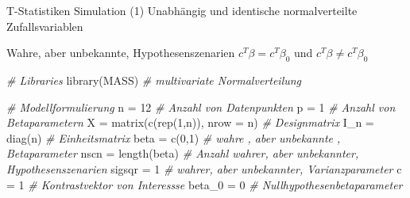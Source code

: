 \documentclass[
  8pt,
  ignorenonframetext,
]{beamer}
\newenvironment{Shaded}{\begin{snugshade}}{\end{snugshade}}
\newcommand{\AttributeTok}[1]{\textcolor[rgb]{0.77,0.63,0.00}{#1}}
\newcommand{\CommentTok}[1]{\textcolor[rgb]{0.56,0.35,0.01}{\textit{#1}}}
\newcommand{\DecValTok}[1]{\textcolor[rgb]{0.00,0.00,0.81}{#1}}
\newcommand{\FunctionTok}[1]{\textcolor[rgb]{0.00,0.00,0.00}{#1}}
\newcommand{\NormalTok}[1]{#1}
\newcommand{\OtherTok}[1]{\textcolor[rgb]{0.56,0.35,0.01}{#1}}
\begin{document}
\begin{frame}[fragile]{T-Statistiken}
\protect\hypertarget{t-statistiken-4}{}
Simulation (1) Unabhängig und identische normalverteilte
Zufallsvariablen

\small

Wahre, aber unbekannte, Hypothesenszenarien \(c^T\beta = c^T\beta_0\)
und \(c^T\beta \neq c^T\beta_0\)

\vspace{2mm}
\tiny
{}

\begin{Shaded}
\begin{Highlighting}[]
\CommentTok{\# Libraries}
\FunctionTok{library}\NormalTok{(MASS)                                                  }\CommentTok{\# multivariate Normalverteilung}

\CommentTok{\# Modellformulierung}
\NormalTok{n          }\OtherTok{=} \DecValTok{12}                                                \CommentTok{\# Anzahl von Datenpunkten}
\NormalTok{p          }\OtherTok{=} \DecValTok{1}                                                 \CommentTok{\# Anzahl von Betaparametern}
\NormalTok{X          }\OtherTok{=} \FunctionTok{matrix}\NormalTok{(}\FunctionTok{c}\NormalTok{(}\FunctionTok{rep}\NormalTok{(}\DecValTok{1}\NormalTok{,n)), }\AttributeTok{nrow =}\NormalTok{ n)                     }\CommentTok{\# Designmatrix}
\NormalTok{I\_n        }\OtherTok{=} \FunctionTok{diag}\NormalTok{(n)                                           }\CommentTok{\# Einheitsmatrix}
\NormalTok{beta       }\OtherTok{=} \FunctionTok{c}\NormalTok{(}\DecValTok{0}\NormalTok{,}\DecValTok{1}\NormalTok{)                                            }\CommentTok{\# wahre , aber unbekannte , Betaparameter}
\NormalTok{nscn       }\OtherTok{=} \FunctionTok{length}\NormalTok{(beta)                                      }\CommentTok{\# Anzahl wahrer, aber unbekannter, Hypothesenszenarien}
\NormalTok{sigsqr     }\OtherTok{=} \DecValTok{1}                                                 \CommentTok{\# wahrer, aber unbekannter, Varianzparameter}
\NormalTok{c          }\OtherTok{=} \DecValTok{1}                                                 \CommentTok{\# Kontrastvektor von Interessse}
\NormalTok{beta\_0     }\OtherTok{=} \DecValTok{0}                                                 \CommentTok{\# Nullhypothesenbetaparameter}


\end{Highlighting}
\end{Shaded}
\end{frame}
\end{document}
